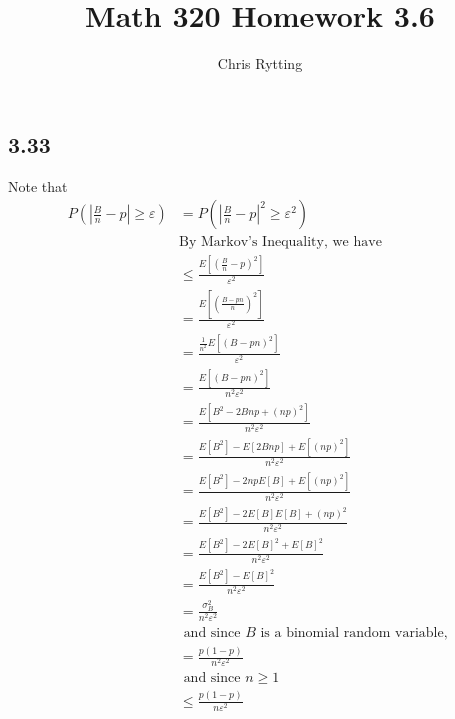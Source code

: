 \documentclass[letterpaper,12pt]{article}
\theoremstyle{definition}
\begin{document}
\title{Math 320 Homework 3.6}
\author{Chris Rytting}
\maketitle

\subsection*{3.33}
Note that
\begin{align*}
    P \left( \left| \frac{B}{n} - p \right| \geq \varepsilon \right) &= P \left( \left| \frac{B}{n} - p \right|^2 \geq \varepsilon^2 \right) \\ 
    &\text{By Markov's Inequality, we have}\\
    &\leq  \frac{E \left[ \left( \frac{B}{n} - p \right)^2 \right]}{\varepsilon^2} \\
    &= \frac{E \left[ \left( \frac{B-pn}{n} \right)^2 \right]}{\varepsilon^2} \\
    &= \frac{\frac{1}{n^2}E \left[ \left( B-pn \right)^2 \right]}{\varepsilon^2} \\
    &= \frac{E \left[ \left( B-pn \right)^2 \right]}{n^2 \varepsilon^2} \\
    &= \frac{E \left[ B^2 - 2Bnp + (np)^2  \right]}{n^2 \varepsilon^2} \\
    &= \frac{E \left[ B^2 \right]-E\left[   2Bnp  \right] + E\left[(np)^2  \right]}{n^2 \varepsilon^2} \\
    &= \frac{E \left[ B^2 \right]-2npE\left[   B  \right] + E\left[(np)^2  \right]}{n^2 \varepsilon^2} \\
    &= \frac{E \left[ B^2 \right]-2E\left[   B  \right]E\left[   B  \right] + (np)^2}{n^2 \varepsilon^2} \\
    &= \frac{E \left[ B^2 \right]-2E\left[   B  \right]^2 + E\left[B  \right]^2}{n^2 \varepsilon^2} \\
    &= \frac{E \left[ B^2 \right]-E\left[   B  \right]^2 }{n^2 \varepsilon^2} \\
    &= \frac{\sigma_B^2}{n^2 \varepsilon^2} \\
    &\text{ and since $B$ is a binomial random variable, }\\
    &= \frac{p(1-p)}{n^2 \varepsilon^2} \\
    &\text{ and since $n \geq 1$}\\
    &\leq \frac{p(1-p)}{n \varepsilon^2} \\
\end{align*}
\end{document}
